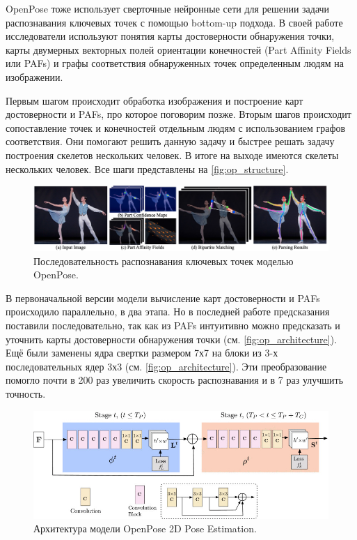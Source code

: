 OpenPose тоже использует сверточные нейронные сети для решении задачи распознавания ключевых точек с помощью bottom-up подхода. В своей работе исследователи используют понятия карты достоверности обнаружения точки, карты двумерных векторных полей ориентации конечностей (Part Affinity Fields или PAFs) и графы соответствия обнаруженных точек определенным людям на изображении.

Первым шагом происходит обработка изображения и построение карт достоверности и PAFs, про которое поговорим позже. Вторым шагов происходит сопоставление точек и конечностей отдельным людям с использованием графов соответствия. Они помогают решить данную задачу и быстрее решать задачу построения скелетов нескольких человек. В итоге на выходе имеются скелеты нескольких человек. Все шаги представлены на \autoref{fig:op_structure}.

\begin{figure}[h]
	\centering
	\includegraphics[width=\textwidth]{./images/OpenPose/structure}
	\caption{Последовательность распознавания ключевых точек моделью OpenPose. \cite{OpenPose}}
	\label{fig:op_structure}
\end{figure}

В первоначальной версии модели \cite{OpenPose_first} вычисление карт достоверности и PAFs происходило параллельно, в два этапа. Но в последней работе \cite{OpenPose} предсказания поставили последовательно, так как из PAFs интуитивно можно предсказать и уточнить карты достоверности обнаружения точки (см. \autoref{fig:op_architecture}). Ещё были заменены ядра свертки размером 7х7 на блоки из 3-х последовательных ядер 3х3 (см. \autoref{fig:op_architecture}). Эти преобразование помогло почти в 200 раз увеличить скорость распознавания и в 7 раз улучшить точность.

\begin{figure}[h]
	\centering
	\includegraphics[width=\textwidth * 4 / 5]{./images/OpenPose/architecture.jpg}
	\caption{Архитектура модели OpenPose 2D Pose Estimation. \cite{OpenPose}}
	\label{fig:op_architecture}
\end{figure}



